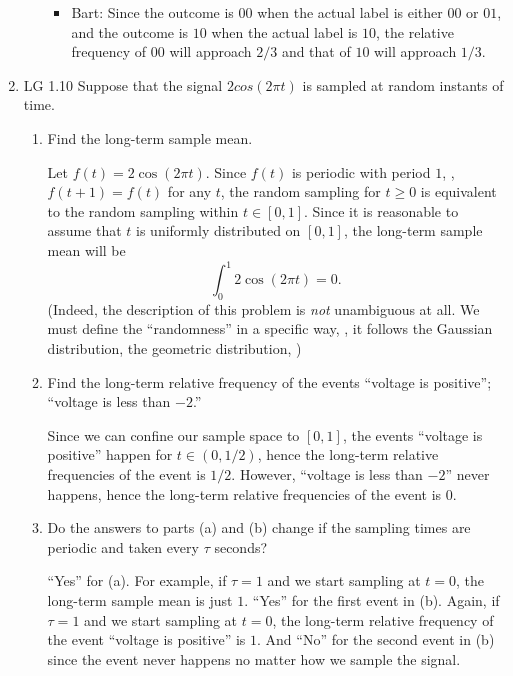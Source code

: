\begin{enumerate}
\begin{enumerate}
\begin{itemize}
				\item Bart:
				Since the outcome is $00$ when the actual label is either $00$ or $01$,
				and the outcome is $10$ when the actual label is $10$,
				the relative frequency of $00$ will approach $2/3$
				and that of $10$ will approach $1/3$.
			\end{itemize}
	\end{enumerate}
	\fi

	\item LG 1.10
	\ifdefined\sol
	Suppose that the signal $2 cos (2\pi t)$
	is sampled at random instants of time.
	\begin{enumerate}
		\item Find the long-term sample mean.
		\begin{solution}
			Let $f(t) = 2\cos(2\pi t)$.
			Since $f(t)$ is periodic with period $1$,
			\ie, $f(t+1) = f(t)$ for any $t$,
			the random sampling for $t\geq0$
			is equivalent to the random sampling
			within $t\in [0,1]$.
			Since it is reasonable to assume that
			$t$ is uniformly distributed on $[0,1]$,
			the long-term sample mean will be
			\[
				\int_0^1 2\cos(2\pi t) = 0.
			\]
			(Indeed, the description of this problem is \emph{not} unambiguous at all.
			We must define the ``randomness'' in a specific way,
			\eg, it follows the Gaussian distribution, the geometric distribution, \etc)
		\end{solution}

		\item Find the long-term relative frequency of the events ``voltage is positive'';
		``voltage is less than $-2$.''
		\begin{solution}
			Since we can confine our sample space to $[0,1]$,
			the events ``voltage is positive'' happen
			for $t\in(0,1/2)$,
			hence the long-term relative frequencies of the event is $1/2$.
			However, ``voltage is less than $-2$'' never happens,
			hence the long-term relative frequencies of the event is $0$.
		\end{solution}

		\item Do the answers to parts (a) and (b) change
		if the sampling times are periodic and taken every $\tau$ seconds?
		\begin{solution}
			``Yes'' for (a).
			For example, if $\tau=1$ and we start sampling at $t=0$,
			the long-term sample mean is just $1$.
			``Yes'' for the first event in (b).
			Again, if $\tau=1$ and we start sampling at $t=0$,
			the long-term relative frequency of the event ``voltage is positive''
			is $1$.
			And ``No'' for the second event in (b)
			since the event never happens
			no matter how we sample the signal.
		\end{solution}
	\end{enumerate}
	\fi


\end{enumerate}
